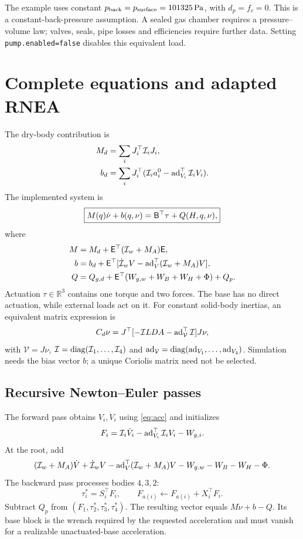 \documentclass[11pt,a4paper]{article}
\newcommand{\R}{\mathbb R}\newcommand{\SE}{\mathrm{SE}(3)}
\begin{document}
The example uses constant
\(p_{\rm back}=p_{\rm surface}=101325\,\mathrm{Pa}\), with \(d_p=f_c=0\).
This is a constant-back-pressure assumption. A sealed gas chamber
requires a pressure--volume law; valves, seals, pipe losses and
efficiencies require further data. Setting \texttt{pump.enabled=false}
disables this equivalent load.
\clearpage

\section{Complete equations and adapted RNEA}
The dry-body contribution is
\begin{align}
M_d&=\sum_iJ_i^\top\mathcal I_iJ_i,\\
b_d&=\sum_iJ_i^\top(\mathcal I_i a_i^0-\operatorname{ad}_{V_i}^\top\mathcal I_iV_i).
\end{align}
The implemented system is
\begin{equation}
\boxed{M(q)\dot\nu+b(q,\nu)=\mathsf B^\top\tau+Q(H,q,\nu),}\label{eq:main}
\end{equation}
where
\begin{align}
M&=M_d+\mathsf E^\top(\mathcal I_w+M_A)\mathsf E,\\
b&=b_d+\mathsf E^\top[\dot{\mathcal I}_wV-\operatorname{ad}_V^\top(\mathcal I_w+M_A)V],\\
Q&=Q_{g,d}+\mathsf E^\top(W_{g,w}+W_B+W_H+\Phi)+Q_p.
\end{align}
Actuation \(\tau\in\R^3\) contains one torque and two forces. The base
has no direct actuation, while external loads act on it. For constant
solid-body inertias, an equivalent matrix expression is
\begin{equation}
C_d\nu=J^\top[-\mathcal I LDA-\operatorname{ad}_{\mathcal V}^\top\mathcal I]J\nu,
\end{equation}
with \(\mathcal V=J\nu\), \(\mathcal I=\operatorname{diag}(\mathcal I_1,\ldots,\mathcal I_4)\)
and \(\operatorname{ad}_{\mathcal V}=\operatorname{diag}(\operatorname{ad}_{V_1},\ldots,\operatorname{ad}_{V_4})\).
Simulation needs the bias vector \(b\); a unique Coriolis matrix need
not be selected.

\subsection{Recursive Newton--Euler passes}
The forward pass obtains \(V_i,\dot V_i\) using \eqref{eq:acc} and
initializes
\begin{equation}
F_i=\mathcal I_i\dot V_i-\operatorname{ad}_{V_i}^\top\mathcal I_iV_i-W_{g,i}.
\end{equation}
At the root, add
\begin{equation}
(\mathcal I_w+M_A)\dot V+\dot{\mathcal I}_wV
-\operatorname{ad}_V^\top(\mathcal I_w+M_A)V-W_{g,w}-W_B-W_H-\Phi.
\end{equation}
The backward pass processes bodies \(4,3,2\):
\begin{equation}
\tau_i^*=S_i^\top F_i,\qquad F_{a(i)}\leftarrow F_{a(i)}+X_i^\top F_i.
\end{equation}
Subtract \(Q_p\) from \((F_1,\tau_2^*,\tau_3^*,\tau_4^*)\). The resulting
vector equals \(M\dot\nu+b-Q\). Its base block is the wrench required
by the requested acceleration and must vanish for a realizable
unactuated-base acceleration.
\end{document}
